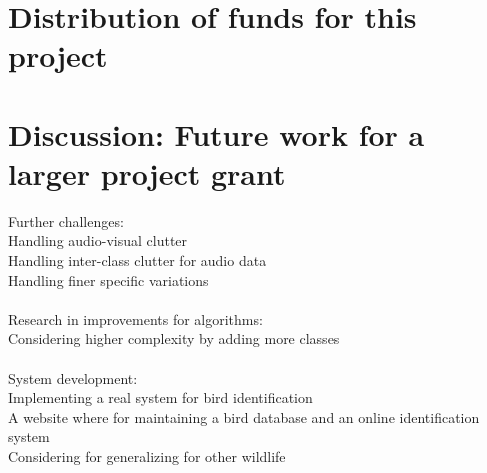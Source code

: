 \documentclass{article}
\begin{document}
\section{Distribution of funds for this project}

\section{Discussion: Future work for a larger project grant}

Further challenges:\\
Handling audio-visual clutter\\
Handling inter-class clutter for audio data\\
Handling finer specific variations \ \\ \ \\
Research in improvements for algorithms:\\
Considering higher complexity by adding more classes \ \\ \ \\
System development:\\
Implementing a real system for bird identification\\
A website where for maintaining a bird database and an online identification system\\
Considering for generalizing for other wildlife\ \\
\end{document}
